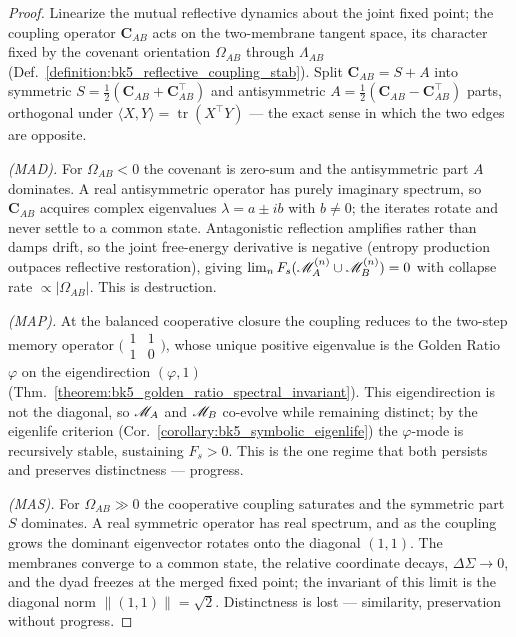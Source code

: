 \begin{proof}
\label{proof:bk5_map_mad_mas_trichotomy}
\leavevmode
Linearize the mutual reflective dynamics about the joint fixed point; the coupling operator $\mathbf{C}_{AB}$ acts on the two-membrane tangent space, its character fixed by the covenant orientation $\Omega_{AB}$ through $\Lambda_{AB}$ (Def.~\ref{definition:bk5_reflective_coupling_stab}). Split $\mathbf{C}_{AB}=S+A$ into symmetric $S=\tfrac12(\mathbf{C}_{AB}+\mathbf{C}_{AB}^{\!\top})$ and antisymmetric $A=\tfrac12(\mathbf{C}_{AB}-\mathbf{C}_{AB}^{\!\top})$ parts, orthogonal under $\langle X,Y\rangle=\operatorname{tr}(X^{\!\top}Y)$ --- the exact sense in which the two edges are opposite.

\emph{(MAD).} For $\Omega_{AB}<0$ the covenant is zero-sum and the antisymmetric part $A$ dominates. A real antisymmetric operator has purely imaginary spectrum, so $\mathbf{C}_{AB}$ acquires complex eigenvalues $\lambda=a\pm ib$ with $b\neq0$; the iterates rotate and never settle to a common state. Antagonistic reflection amplifies rather than damps drift, so the joint free-energy derivative is negative (entropy production outpaces reflective restoration), giving $\lim_n F_s(\mathscr{M}_A^{(n)}\cup\mathscr{M}_B^{(n)})=0$ with collapse rate $\propto|\Omega_{AB}|$. This is destruction.

\emph{(MAP).} At the balanced cooperative closure the coupling reduces to the two-step memory operator $\big(\begin{smallmatrix}1&1\\1&0\end{smallmatrix}\big)$, whose unique positive eigenvalue is the Golden Ratio $\varphi$ on the eigendirection $(\varphi,1)$ (Thm.~\ref{theorem:bk5_golden_ratio_spectral_invariant}). This eigendirection is not the diagonal, so $\mathscr{M}_A$ and $\mathscr{M}_B$ co-evolve while remaining distinct; by the eigenlife criterion (Cor.~\ref{corollary:bk5_symbolic_eigenlife}) the $\varphi$-mode is recursively stable, sustaining $F_s>0$. This is the one regime that both persists and preserves distinctness --- progress.

\emph{(MAS).} For $\Omega_{AB}\gg0$ the cooperative coupling saturates and the symmetric part $S$ dominates. A real symmetric operator has real spectrum, and as the coupling grows the dominant eigenvector rotates onto the diagonal $(1,1)$. The membranes converge to a common state, the relative coordinate decays, $\Delta\Sigma\to0$, and the dyad freezes at the merged fixed point; the invariant of this limit is the diagonal norm $\|(1,1)\|=\sqrt2$. Distinctness is lost --- similarity, preservation without progress.


\end{proof}
